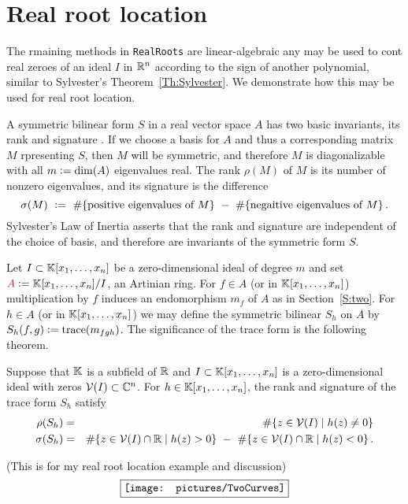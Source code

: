 
\section{Real root location}\label{S:three}
%
%
The rmaining methods in  \texttt{RealRoots} are linear-algebraic any may be used to cont real zeroes of an ideal $I$ in $\mathbb{R}^n$ according to
the sign of another polynomial, similar to Sylvester's Theorem~\ref{Th:Sylvester}.
We demonstrate how this may be used for real root location.

A symmetric bilinear form $S$ in a real vector space $A$ has two basic invariants, its rank  and signature
.
If we choose a basis for $A$ and thus a corresponding matrix $M$ rpresenting $S$, then $M$ will be symmetric, and therefore $M$ is
diagonalizable with all $m\vcentcolon = \dim(A)$ eigenvalues real.
The rank $\rho(M)$ of $M$ is its number of nonzero eigenvalues, and its signature  is the difference
\[
\sigma(M)\ \vcentcolon =\ \#\{\mbox{positive eigenvalues of $M$}\}
\ -\ \#\{\mbox{negaitive eigenvalues of $M$}\}\,.
\]
Sylvester's Law of Inertia asserts that the rank and signature are independent of the choice of basis, and therefore are invariants of the
symmetric form $S$.

Let $I\subset\mathbb{K}[x_1,\dotsc,x_n]$ be a zero-dimensional ideal of degree $m$ and set $\defcolor{A}\vcentcolon=\KK[x_1,\dotsc,x_n]/I$, an
Artinian ring.
For $f\in A$ (or in $\mathbb{K}[x_1,\dotsc,x_n]$) multiplication by $f$ induces an endomorphism $m_f$ of $A$ as in Section~\ref{S:two}.
For $h\in A$ (or in $\mathbb{K}[x_1,\dotsc,x_n]$) we may define the symmetric bilinear  $S_h$ on $A$ by
$S_h(f,g)\vcentcolon= \mbox{trace}(m_{fgh})$.
The significance of the trace form is the following theorem.

\begin{theorem}
  Suppose that $\mathbb{K}$ is a subfield of $\mathbb{R}$ and $I\subset\mathbb{K}[x_1,\dotsc,x_n]$ is a zero-dimensional ideal with zeros
  $\mathcal{V}(I)\subset\mathbb{C}^n$.
  For $h\in\mathbb{K}[x_1,\dotsc,x_n]$, the rank and signature of the trace form $S_h$ satisfy
  \begin{eqnarray*}
    \rho(S_h)&=&
      \#\{ z \in \calV(I) \mid h(z)\neq 0\}   \\
    \sigma(S_h)&=&
        \#\{ z \in \calV(I)\cap\RR \mid h(z)> 0\} \ -\ 
        \#\{ z \in \calV(I)\cap\RR \mid h(z)< 0\} \,.
  \end{eqnarray*}
\end{theorem}



(This is for my real root location example and discussion)
\[
\fbox{\texttt{[image: pictures/TwoCurves]}}
\]
%
%
